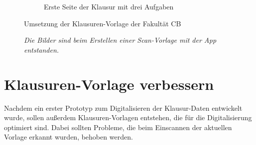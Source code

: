 \documentclass[notables, nomenclature, oneside, 150]{HSMW-Thesis}
\begin{document}
\begin{figure}[h!]
\begin{subfigure}[t]{0.48\textwidth}
        	\caption{Erste Seite der Klausur mit drei Aufgaben}
        	\label{fig:seite2}
    	\end{subfigure}
    	\caption{Umsetzung der Klausuren-Vorlage der Fakultät CB}
    	\caption*{\textit{Die Bilder sind beim Erstellen einer Scan-Vorlage mit der App entstanden.}}
    	\label{fig:klausur}
	\end{figure}
	
	\section{Klausuren-Vorlage verbessern}
	Nachdem ein erster Prototyp zum Digitalisieren der Klausur-Daten entwickelt wurde, sollen außerdem Klausuren-Vorlagen entstehen, die für die Digitalisierung optimiert sind. Dabei sollten Probleme, die beim Einscannen der aktuellen Vorlage erkannt wurden, behoben werden. 
	
\end{document}
